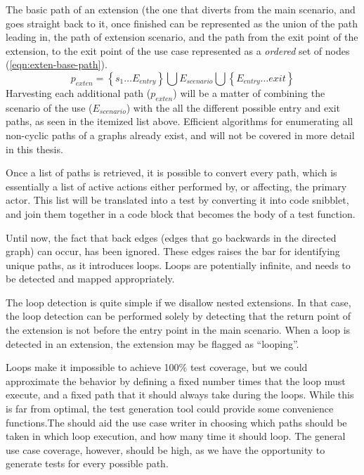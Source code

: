 \noindent The basic path of an extension (the one that diverts from the main scenario, and goes straight back to it, once finished can be represented as the union of the path leading in, the path of extension scenario, and the path from the exit point of the extension, to the exit point of the use case represented as a \emph{ordered} set of nodes (\ref{eqn:exten-base-path}). 
\begin{equation}
p_{exten} = \left\lbrace s_1 \dots E_{entry} \right\rbrace \bigcup E_{scenario} \bigcup \left\lbrace E_{entry} \dots exit \right\rbrace
\label{eqn:exten-base-path}
\end{equation}
\noindent Harvesting each additional path ($p_{exten}$) will be a matter of combining the scenario of the use ($E_{scenario}$) with the all the different possible entry and exit paths, as seen in the itemized list above. Efficient algorithms for enumerating all non-cyclic paths of a graphs already exist\cite{rubin1978enumerating}, and will not be covered in more detail in this thesis.\medskip

\noindent Once a list of paths is retrieved, it is possible to convert every path, which is essentially a list of active actions either performed by, or affecting, the primary actor. This list will be translated into a test by converting it into code snibblet, and join them together in a code block that becomes the body of a test function.\medskip

\noindent Until now, the fact that back edges (edges that go backwards in the directed graph) can occur, has been ignored. These edges raises the bar for identifying unique paths, as it introduces loops. Loops are potentially infinite, and needs to be detected and mapped appropriately.\medskip

\noindent The loop detection is quite simple if we disallow nested extensions. In that case, the loop detection can be performed solely by detecting that the return point of the extension is not before the entry point in the main scenario. When a loop is detected in an extension, the extension may be flagged as ``looping''.\medskip

\noindent Loops make it impossible to achieve 100\% test coverage, but we could approximate the behavior by defining a fixed number times that the loop must execute, and a fixed path that it should always take during the loops. While this is far from optimal, the test generation tool could provide some convenience functions.The should aid the use case writer in choosing which paths should be taken in which loop execution, and how many time it should loop. The general use case coverage, however, should be high, as we have the opportunity to generate tests for every possible path.

